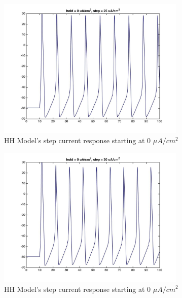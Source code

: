 \documentclass{beamer}
\begin{document}
\begin{frame}
  \begin{figure}
    \centering
    \includegraphics[width = 0.8\textwidth]{./images/current_0_25.jpg}
    \caption{HH Model's step current response starting at 0 $\mu A/cm^2$}
  \end{figure}
\end{frame}


\begin{frame}
  \begin{figure}
    \centering
    \includegraphics[width = 0.8\textwidth]{./images/current_0_30.jpg}
    \caption{HH Model's step current response starting at 0 $\mu A/cm^2$}
  \end{figure}
\end{frame}
\end{document}
